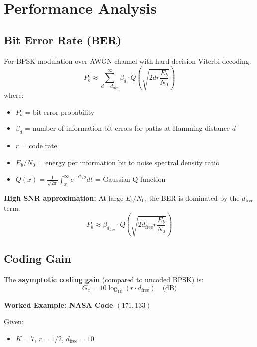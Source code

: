 \section{Performance Analysis}

\subsection{Bit Error Rate (BER)}

For BPSK modulation over AWGN channel with hard-decision Viterbi decoding:
\begin{equation}
P_b \approx \sum_{d=d_{\text{free}}}^{\infty} \beta_d \cdot Q\left(\sqrt{2 d r \frac{E_b}{N_0}}\right)
\label{eq:ber-convolutional}
\end{equation}
where:
\begin{itemize}
\item $P_b$ = bit error probability
\item $\beta_d$ = number of information bit errors for paths at Hamming distance $d$
\item $r$ = code rate
\item $E_b/N_0$ = energy per information bit to noise spectral density ratio
\item $Q(x) = \frac{1}{\sqrt{2\pi}} \int_x^\infty e^{-t^2/2} dt$ = Gaussian Q-function
\end{itemize}

\textbf{High SNR approximation:} At large $E_b/N_0$, the BER is dominated by the $d_{\text{free}}$ term:
\begin{equation}
P_b \approx \beta_{d_{\text{free}}} \cdot Q\left(\sqrt{2 d_{\text{free}} r \frac{E_b}{N_0}}\right)
\label{eq:ber-high-snr}
\end{equation}

\subsection{Coding Gain}

The \textbf{asymptotic coding gain} (compared to uncoded BPSK) is:
\begin{equation}
G_c = 10 \log_{10}(r \cdot d_{\text{free}}) \quad \text{(dB)}
\label{eq:coding-gain}
\end{equation}

\textbf{Worked Example: NASA Code $(171, 133)$}

Given:
\begin{itemize}
\item $K = 7$, $r = 1/2$, $d_{\text{free}} = 10$
\end{itemize}

